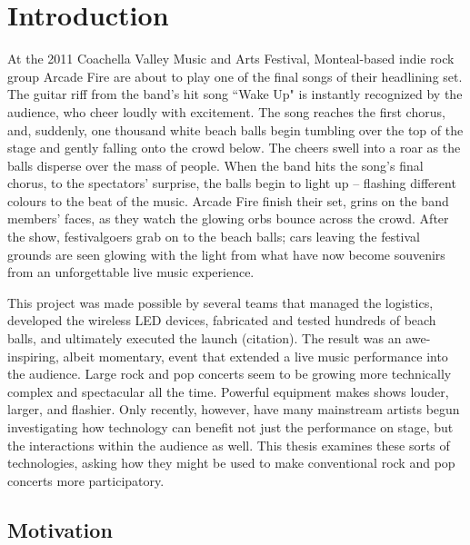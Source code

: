 \chapter{Introduction}

At the 2011 Coachella Valley Music and Arts Festival, Monteal-based indie rock group Arcade Fire are about to play one of the final songs of their headlining set. The guitar riff from the band's hit song ``Wake Up" is instantly recognized by the audience, who cheer loudly with excitement. The song reaches the first chorus, and, suddenly, one thousand white beach balls begin tumbling over the top of the stage and gently falling onto the crowd below. The cheers swell into a roar as the balls disperse over the mass of people. When the band hits the song's final chorus, to the spectators' surprise, the balls begin to light up -- flashing different colours to the beat of the music. Arcade Fire finish their set, grins on the band members' faces, as they watch the glowing orbs bounce across the crowd. After the show, festivalgoers grab on to the beach balls; cars leaving the festival grounds are seen glowing with the light from what have now become souvenirs from an unforgettable live music experience.

This project was made possible by several teams that managed the logistics, developed the wireless LED devices, fabricated and tested hundreds of beach balls, and ultimately executed the launch (citation). The result was an awe-inspiring, albeit momentary, event that extended a live music performance into the audience. Large rock and pop concerts seem to be growing more technically complex and spectacular all the time. Powerful equipment makes shows louder, larger, and flashier. Only recently, however, have many mainstream artists begun investigating how technology can benefit not just the performance on stage, but the interactions within the audience as well. This thesis examines these sorts of technologies, asking how they might be used to make conventional rock and pop concerts more participatory.




\section{Motivation}

